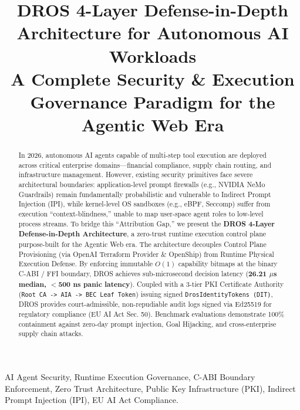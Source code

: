 \documentclass[conference]{IEEEtran}
\begin{document}
\title{DROS 4-Layer Defense-in-Depth Architecture for Autonomous AI Workloads\\
{\footnotesize \textnormal{A Complete Security \& Execution Governance Paradigm for the Agentic Web Era}}
}

\author{
}

\maketitle
\thispagestyle{plain}
\pagestyle{plain}

\begin{abstract}
In 2026, autonomous AI agents capable of multi-step tool execution are deployed across critical enterprise domains—financial compliance, supply chain routing, and infrastructure management. However, existing security primitives face severe architectural boundaries: application-level prompt firewalls (e.g., NVIDIA NeMo Guardrails) remain fundamentally probabilistic and vulnerable to Indirect Prompt Injection (IPI), while kernel-level OS sandboxes (e.g., eBPF, Seccomp) suffer from execution ``context-blindness,'' unable to map user-space agent roles to low-level process streams. To bridge this ``Attribution Gap,'' we present the \textbf{DROS 4-Layer Defense-in-Depth Architecture}, a zero-trust runtime execution control plane purpose-built for the Agentic Web era. The architecture decouples Control Plane Provisioning (via OpenAI Terraform Provider \& OpenShip) from Runtime Physical Execution Defense. By enforcing immutable $O(1)$ capability bitmaps at the binary C-ABI / FFI boundary, DROS achieves sub-microsecond decision latency (\textbf{26.21 $\mu$s median, $<$500 ns panic latency}). Coupled with a 3-tier PKI Certificate Authority (\texttt{Root CA -> AIA -> BEC Leaf Token}) issuing signed \texttt{DrosIdentityTokens (DIT)}, DROS provides court-admissible, non-repudiable audit logs signed via Ed25519 for regulatory compliance (EU AI Act Sec. 50). Benchmark evaluations demonstrate 100\% containment against zero-day prompt injection, Goal Hijacking, and cross-enterprise supply chain attacks.
\end{abstract}

\begin{IEEEkeywords}
AI Agent Security, Runtime Execution Governance, C-ABI Boundary Enforcement, Zero Trust Architecture, Public Key Infrastructure (PKI), Indirect Prompt Injection (IPI), EU AI Act Compliance.
\end{IEEEkeywords}
\end{document}
